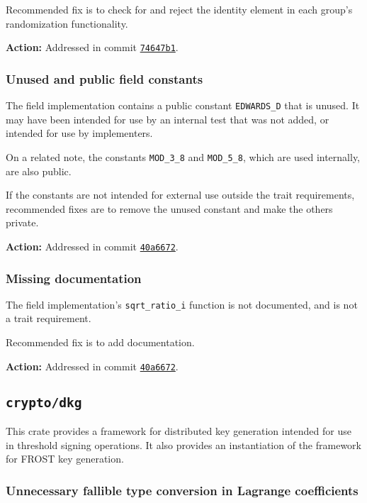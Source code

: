 \documentclass{article}
\begin{document}
Recommended fix is to check for and reject the identity element in each group's randomization functionality.

\textbf{Action:} Addressed in commit \href{https://github.com/serai-dex/serai/commit/74647b1b5273cad7f9fd2dfe048257164cba8275}{\texttt{74647b1}}.


\subsubsection{Unused and public field constants}

The field implementation contains a public constant \texttt{EDWARDS\_D} that is unused.
It may have been intended for use by an internal test that was not added, or intended for use by implementers.

On a related note, the constants \texttt{MOD\_3\_8} and \texttt{MOD\_5\_8}, which are used internally, are also public.

If the constants are not intended for external use outside the trait requirements, recommended fixes are to remove the unused constant and make the others private.

\textbf{Action:} Addressed in commit \href{https://github.com/serai-dex/serai/commit/40a6672547c371c1bc8e624bea1844aeb4dbceb8}{\texttt{40a6672}}.


\subsubsection{Missing documentation}

The field implementation's \texttt{sqrt\_ratio\_i} function is not documented, and is not a trait requirement.

Recommended fix is to add documentation.

\textbf{Action:} Addressed in commit \href{https://github.com/serai-dex/serai/commit/40a6672547c371c1bc8e624bea1844aeb4dbceb8}{\texttt{40a6672}}.


\subsection{\texttt{crypto/dkg}}

This crate provides a framework for distributed key generation intended for use in threshold signing operations.
It also provides an instantiation of the framework for FROST key generation.


\subsubsection{Unnecessary fallible type conversion in Lagrange coefficients}
\end{document}
